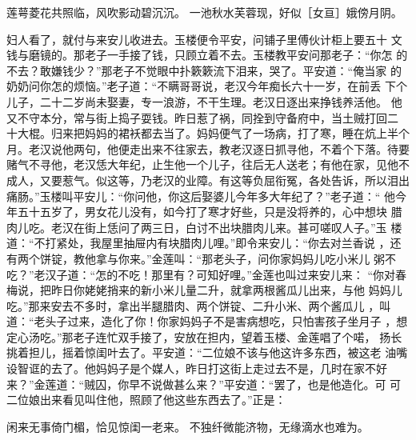 莲萼菱花共照临，风吹影动碧沉沉。
一池秋水芙蓉现，好似［女亘］娥傍月阴。

妇人看了，就付与来安儿收进去。玉楼便令平安，问铺子里傅伙计柜上要五十
文钱与磨镜的。那老子一手接了钱，只顾立着不去。玉楼教平安问那老子：“你怎
的不去？敢嫌钱少？”那老子不觉眼中扑簌簌流下泪来，哭了。平安道：“俺当家
的奶奶问你怎的烦恼。”老子道：“不瞒哥哥说，老汉今年痴长六十一岁，在前丢
下个儿子，二十二岁尚未娶妻，专一浪游，不干生理。老汉日逐出来挣钱养活他。
他又不守本分，常与街上捣子耍钱。昨日惹了祸，同拴到守备府中，当土贼打回二
十大棍。归来把妈妈的裙袄都去当了。妈妈便气了一场病，打了寒，睡在炕上半个
月。老汉说他两句，他便走出来不往家去，教老汉逐日抓寻他，不着个下落。待要
赌气不寻他，老汉恁大年纪，止生他一个儿子，往后无人送老；有他在家，见他不
成人，又要惹气。似这等，乃老汉的业障。有这等负屈衔冤，各处告诉，所以泪出
痛肠。”玉楼叫平安儿：“你问他，你这后娶婆儿今年多大年纪了？”老子道：“
他今年五十五岁了，男女花儿没有，如今打了寒才好些，只是没将养的，心中想块
腊肉儿吃。老汉在街上恁问了两三日，白讨不出块腊肉儿来。甚可嗟叹人子。”玉
楼道：“不打紧处，我屋里抽屉内有块腊肉儿哩。”即令来安儿：“你去对兰香说
，还有两个饼锭，教他拿与你来。”金莲叫：“那老头子，问你家妈妈儿吃小米儿
粥不吃？”老汉子道：“怎的不吃！那里有？可知好哩。”金莲也叫过来安儿来：
“你对春梅说，把昨日你姥姥捎来的新小米儿量二升，就拿两根酱瓜儿出来，与他
妈妈儿吃。”那来安去不多时，拿出半腿腊肉、两个饼锭、二升小米、两个酱瓜儿
，叫道：“老头子过来，造化了你！你家妈妈子不是害病想吃，只怕害孩子坐月子
，想定心汤吃。”那老子连忙双手接了，安放在担内，望着玉楼、金莲唱了个喏，
扬长挑着担儿，摇着惊闺叶去了。平安道：“二位娘不该与他这许多东西，被这老
油嘴设智诓的去了。他妈妈子是个媒人，昨日打这街上走过去不是，几时在家不好
来？”金莲道：“贼囚，你早不说做甚么来？”平安道：“罢了，也是他造化。可
可二位娘出来看见叫住他，照顾了他这些东西去了。”正是：

闲来无事倚门楣，恰见惊闺一老来。
不独纤微能济物，无缘滴水也难为。